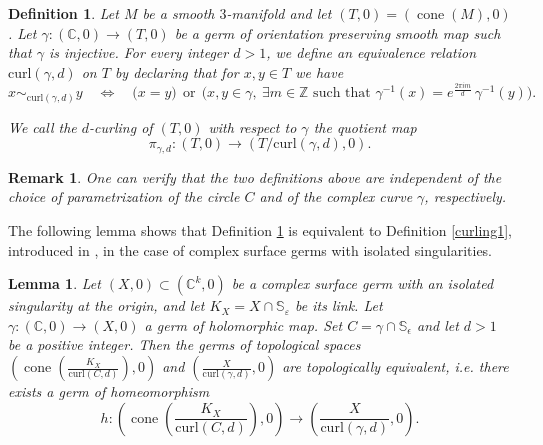 \documentclass[reqno,dvipsnames,12pt]{amsart}
\newtheorem{lemm}[thm]{Lemma}
\newtheorem{rema}[thm]{Remark}
\newtheorem{defi}[thm]{Definition}
\begin{document}
\begin{defi}\label{curling2}
Let $M$ be a smooth $3$-manifold and let $(T,0)=(\operatorname{cone}(M),0)$. Let
$\gamma:(\mathbb{C},0)\to (T,0)$ be a germ of orientation preserving smooth map such that $\gamma$ is injective. For every integer $d>1$, we define an equivalence relation $\mathrm{curl}(\gamma,d)$ on $T$ by declaring that for $x,y\in T$ we have \[
x \sim_{\mathrm{curl}(\gamma,d)} y
\quad \Longleftrightarrow \quad
\bigl( x=y \bigr)
\ \ \text{or}\ \ 
\bigl( x,y\in\gamma,\ \exists m\in\mathbb Z \text{ such that }
\gamma^{-1}(x)=e^{\frac{2\pi i m}{d}}\,\gamma^{-1}(y)\bigr).
\]


We call the $d$-curling of $(T,0)$ with respect to $\gamma$ the quotient map
\[
\pi_{\gamma,d}:(T,0)\to (T/\mathrm{curl}(\gamma,d),0).
\]
\end{defi}
\begin{rema}
One can verify that the two definitions above are independent of the choice of parametrization of the circle $C$ and of the complex curve $\gamma$, respectively.
\end{rema}
The following lemma shows that Definition \ref{curling2} is equivalent to Definition \ref{curling1}, introduced in \cite{luengopichon}, in the case of complex surface germs with isolated singularities.
\begin{lemm}
Let $(X,0) \subset 
(\mathbb{C}^k,0)$ be a complex surface germ with an isolated singularity at the origin, and let $K_X=X\cap \mathbb{S}_\varepsilon$ be its link. Let $\gamma:(\mathbb{C},0)\to (X,0)$ a germ of holomorphic map. Set
$C=\gamma\cap \mathbb{S}_\epsilon$
and let $d>1$ be a positive integer. Then the germs of topological spaces
$\left(
\operatorname{cone}
\left(
\frac{K_X}{\mathrm{curl}(C,d)}
\right),0
\right)$ and $\left(
\frac{X}{\mathrm{curl}(\gamma,d)},0
\right)$
are topologically equivalent, i.e. there exists a germ of homeomorphism
$$
h:
\left(
\operatorname{cone}
\left(
\frac{K_X}{\mathrm{curl}(C,d)}
\right),0
\right)
\longrightarrow
\left(
\frac{X}{\mathrm{curl}(\gamma,d)},0
\right).
$$
\end{lemm}
\end{document}
